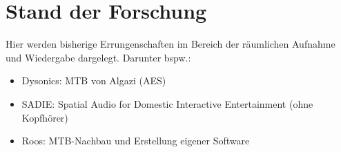 \chapter[Stand der Forschung]{Stand der Forschung} 
\label{chap:3_SDF}

Hier werden bisherige Errungenschaften im Bereich der räumlichen Aufnahme und Wiedergabe dargelegt. Darunter bspw.:

\begin{itemize}
    \item Dysonics: MTB von Algazi (AES)
    \item SADIE:   Spatial Audio for Domestic Interactive Entertainment (ohne Kopfhörer)
    \item Roos:     MTB-Nachbau und Erstellung eigener Software
\end{itemize}